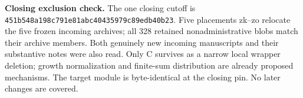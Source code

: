 \textbf{Closing exclusion check.} The one closing cutoff is \texttt{451b548a198c791e81abc40435979c89edb40b23}. Five placements zk--zo relocate the five frozen incoming archives; all 328 retained nonadministrative blobs match their archive members. Both genuinely new incoming manuscripts and their substantive notes were also read. Only C survives as a narrow local wrapper deletion; growth normalization and finite-sum distribution are already proposed mechanisms. The target module is byte-identical at the closing pin. No later changes are covered.
